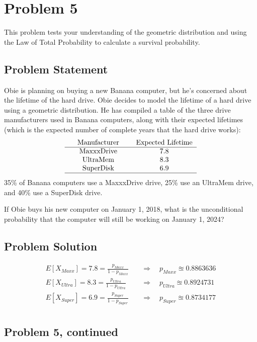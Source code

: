 \documentclass[12pt]{article}
\theoremstyle{definition}
\begin{document}
\newpage
\section*{Problem 5}

This problem tests your understanding of the geometric distribution and using the Law of Total Probability to calculate a survival probability.

\subsection*{Problem Statement}

Obie is planning on buying a new Banana computer, but he's concerned about the lifetime of the hard drive. Obie decides to model the lifetime of a hard drive using a geometric distribution. He has compiled a table of the three drive manufacturers used in Banana computers, along with their expected lifetimes (which is the expected number of complete years that the hard drive works):
$$
\begin{tabular}{ccccc}
& Manufacturer & & Expected Lifetime\\
\hline
& MaxxxDrive & & 7.8\\
& UltraMem & & 8.3\\
& SuperDisk & & 6.9\\
\hline
\end{tabular}
$$
35\% of Banana computers use a MaxxxDrive drive, 25\% use an UltraMem drive, and 40\% use a SuperDisk drive.

\bigskip
If Obie buys his new computer on January 1, 2018, what is the unconditional probability that the computer will still be working on January 1, 2024?


\subsection*{Problem Solution}
\begin{align*}
E[X_{Maxx}] = 7.8 = \frac{p_{Maxx}}{1 - p_{Maxx}} \quad&\Rightarrow\quad p_{Maxx} \approxeq 0.8863636\\
E[X_{Ultra}] = 8.3 = \frac{p_{Ultra}}{1 - p_{Ultra}} \quad&\Rightarrow\quad p_{Ultra} \approxeq 0.8924731 \\
E[X_{Super}] = 6.9 = \frac{p_{Super}}{1 - p_{Super}} \quad&\Rightarrow\quad p_{Super} \approxeq 0.8734177\\
\end{align*}

\newpage
\subsection*{Problem 5, continued}
\end{document}
